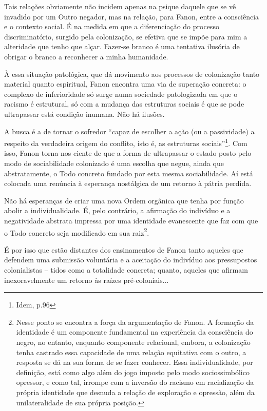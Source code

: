 Tais relações obviamente não incidem apenas na psique daquele que se vê
invadido por um Outro negador, mas na relação, para Fanon, entre a
consciência e o contexto social. É na medida em que a diferenciação do
processo discriminatório, surgido pela colonização, se efetiva que se
impõe para mim a alteridade que tenho que alçar. Fazer-se branco é uma
tentativa ilusória de obrigar o branco a reconhecer a minha humanidade.

À essa situação patológica, que dá movimento aos processos de
colonização tanto material quanto espiritual, Fanon encontra uma via de
superação concreta: o complexo de inferioridade só surge numa sociedade
patologizada em que o racismo é estrutural, só com a mudança das
estruturas sociais é que se pode ultrapassar está condição inumana. Não
há ilusões.

A busca é a de tornar o sofredor ``capaz de escolher a ação (ou a
passividade) a respeito da verdadeira origem do conflito, isto é, as
estruturas sociais''\footnote{Idem, p.96}. Com isso, Fanon torna-nos
ciente de que a forma de ultrapassar o estado posto pelo modo de
sociabilidade colonizado é uma escolha que negue, ainda que
abstratamente, o Todo concreto fundado por esta mesma sociabilidade. Aí
está colocada uma renúncia à esperança nostálgica de um retorno à pátria
perdida.

Não há esperanças de criar uma nova Ordem orgânica que tenha por função
abolir a individualidade. É, pelo contrário, a afirmação do indivíduo e
a negatividade abstrata impressa por uma identidade evanescente que faz
com que o Todo concreto seja modificado em sua raiz\footnote{Nesse ponto
  se encontra a força da argumentação de Fanon. A formação da identidade
  é um componente fundamental na experiência da consciência do negro, no
  entanto, enquanto componente relacional, embora, a colonização tenha
  castrado essa capacidade de uma relação equitativa com o outro, a
  resposta se dá na sua forma de se fazer conhecer. Essa
  individualidade, por definição, está como algo além do jogo imposto
  pelo modo sociossimbólico opressor, e como tal, irrompe com a inversão
  do racismo em racialização da própria identidade que desnuda a relação
  de exploração e opressão, além da unilateralidade de sua própria
  posição.}.

É por isso que estão distantes dos ensinamentos de Fanon tanto aqueles
que defendem uma submissão voluntária e a aceitação do indivíduo aos
pressupostos colonialistas -- tidos como a totalidade concreta; quanto,
aqueles que afirmam inexoravelmente um retorno às raízes
pré-coloniais...

